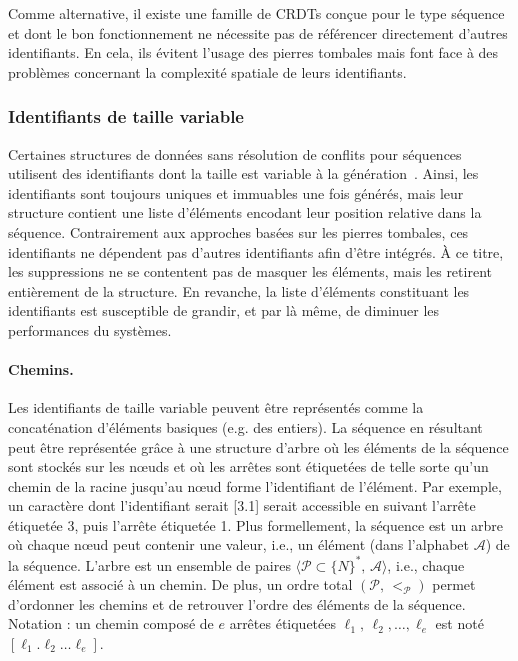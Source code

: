 Comme alternative, il existe une famille de CRDTs conçue pour le type séquence
et dont le bon fonctionnement ne nécessite pas de référencer directement
d'autres identifiants. En cela, ils évitent l'usage des pierres tombales mais
font face à des problèmes concernant la complexité spatiale de leurs
identifiants.

\subsubsection{Identifiants de taille variable}
\label{repl:subsubsec:variable}

Certaines structures de données sans résolution de conflits pour séquences
utilisent des identifiants dont la taille est variable à la
génération~\cite{andre2013supporting, preguica2009commutative,
  weiss2009logoot}. Ainsi, les identifiants sont toujours uniques et immuables
une fois générés, mais leur structure contient une liste d'éléments encodant
leur position relative dans la séquence.  Contrairement aux approches basées sur
les pierres tombales, ces identifiants ne dépendent pas d'autres identifiants
afin d'être intégrés. À ce titre, les suppressions ne se contentent pas de
masquer les éléments, mais les retirent entièrement de la structure. En
revanche, la liste d'éléments constituant les identifiants est susceptible de
grandir, et par là même, de diminuer les performances du systèmes.


\paragraph{Chemins.}

Les identifiants de taille variable peuvent être représentés comme la
concaténation d'éléments basiques (e.g. des entiers). La séquence en résultant
peut être représentée grâce à une structure d'arbre où les éléments de la
séquence sont stockés sur les nœuds et où les arrêtes sont étiquetées de telle
sorte qu'un chemin de la racine jusqu'au nœud forme l'identifiant de
l'élément. Par exemple, un caractère dont l'identifiant serait [3.1] serait
accessible en suivant l'arrête étiquetée 3, puis l'arrête étiquetée 1. Plus
formellement, la séquence est un arbre où chaque nœud peut contenir une valeur,
i.e., un élément (dans l'alphabet $\mathcal{A}$) de la séquence. L'arbre est un
ensemble de paires $\langle \mathcal{P}\subset \{N\}^*,\, \mathcal{A} \rangle$,
i.e., chaque élément est associé à un chemin. De plus, un ordre total
$(\mathcal{P},\, <_\mathcal{P})$ permet d'ordonner les chemins et de retrouver
l'ordre des éléments de la séquence. Notation : un chemin composé de $e$ arrêtes
étiquetées $\ell_1,\,\ell_2,\ldots,\ell_e$ est noté
$[\ell_1.\ell_2\ldots\ell_e]$.

